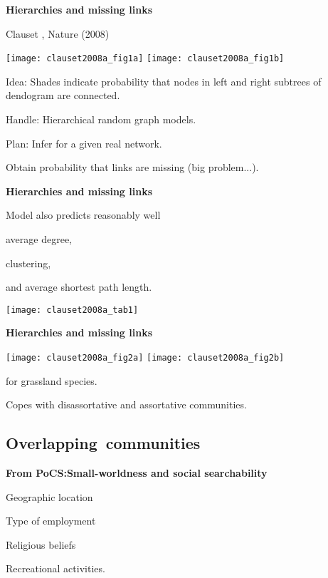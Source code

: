   \textbf{Hierarchies and missing links}

  Clauset \etal, Nature (2008)\cite{clauset2008a}

  \texttt{[image: clauset2008a\_fig1a]}
  \texttt{[image: clauset2008a\_fig1b]}

  
  
    Idea: Shades indicate probability that nodes in 
    left and right subtrees of 
    dendogram are connected.
  
    Handle: \alert{Hierarchical random graph models}.
  
    Plan: Infer  for a given real network.
  
    Obtain probability that links are missing (big problem...).
  


  \textbf{Hierarchies and missing links}

  
  
    Model also predicts reasonably well
    
     
      average degree,
     
      clustering, 
     
      and average shortest path length.
    
  

  \texttt{[image: clauset2008a\_tab1]}


  \textbf{Hierarchies and missing links}

  \texttt{[image: clauset2008a\_fig2a]}
  \texttt{[image: clauset2008a\_fig2b]}

  
  
     for grassland species.
  
    Copes with disassortative and assortative communities.
  


\subsection{Overlapping\ communities}

  \textbf{From PoCS:\newline Small-worldness and social searchability}

  

  \bigskip

  {
    
     
      Geographic location
     
      Type of employment
     
      Religious beliefs
     
      Recreational activities.
    
  }

